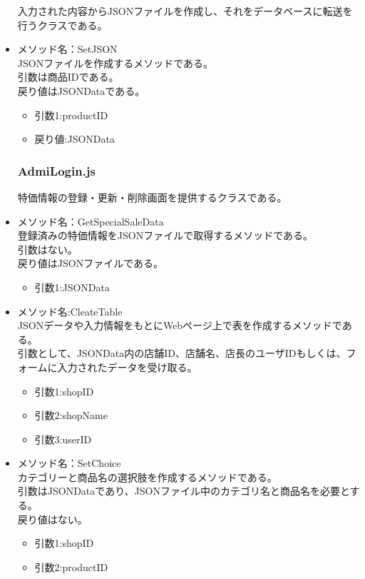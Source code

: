 \documentclass[a4j]{jarticle}
\begin{document}
\begin{itemize}
入力された内容からJSONファイルを作成し、それをデータベースに転送を行うクラスである。\\

\item メソッド名：SetJSON\\

JSONファイルを作成するメソッドである。\\
引数は商品IDである。\\
戻り値はJSONDataである。
	\begin{itemize}
		\item 引数1:productID
		\item 戻り値:JSONData
	\end{itemize}
\subsubsection{AdmiLogin.js}

特価情報の登録・更新・削除画面を提供するクラスである。
%
\item メソッド名：GetSpecialSaleData\\

登録済みの特価情報をJSONファイルで取得するメソッドである。\\
引数はない。\\
戻り値はJSONファイルである。


	\begin{itemize}
		\item 引数1:JSONData
	\end{itemize}
	\item メソッド名:CleateTable\\

JSONデータや入力情報をもとにWebページ上で表を作成するメソッドである。\\
引数として、JSONData内の店舗ID、店舗名、店長のユーザIDもしくは、フォームに入力されたデータを受け取る。
	\begin{itemize}
		\item 引数1:shopID
		\item 引数2:shopName
		\item 引数3:userID
	\end{itemize}
\item メソッド名：SetChoice\\

カテゴリーと商品名の選択肢を作成するメソッドである。\\
引数はJSONDataであり、JSONファイル中のカテゴリ名と商品名を必要とする。\\
戻り値はない。
	\begin{itemize}
		\item 引数1:shopID
		\item 引数2:productID
	\end{itemize}


\end{itemize}
\end{document}
